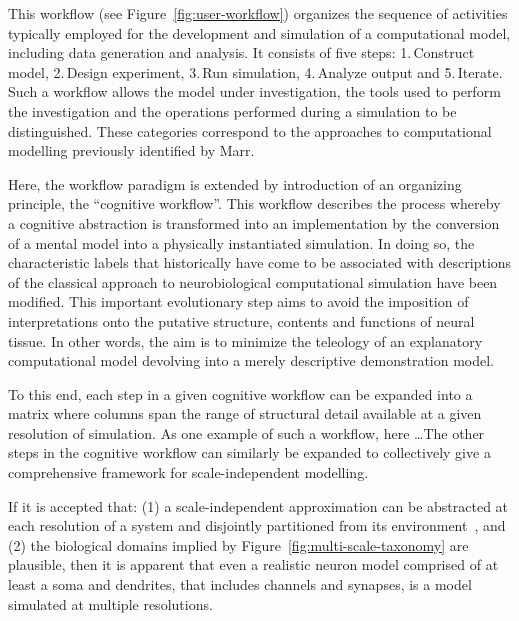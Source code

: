\documentclass[11pt,3p,twocolumn]{JMN}
\begin{document}
This workflow (see Figure~\ref{fig:user-workflow}) organizes the sequence of activities typically employed for the development and simulation of a computational model, including data generation and analysis.  It consists of five steps: 1.\,Construct model, 2.\,Design experiment, 3.\,Run simulation, 4.\,Analyze output and 5.\,Iterate.  Such a workflow allows the model under investigation, the tools used to perform the investigation and the operations performed during a simulation to be distinguished. These categories correspond to the approaches to computational modelling previously identified by Marr.  

Here, the workflow paradigm is extended by introduction of an organizing principle, the “cognitive workflow”. This workflow describes the process whereby a cognitive abstraction is transformed into an implementation by the conversion of a mental model into a physically instantiated simulation. In doing so, the characteristic labels that historically have come to be associated with descriptions of the classical approach to neurobiological computational simulation have been modified. This important evolutionary step aims to avoid the imposition of interpretations onto the putative structure, contents and functions of neural tissue. In other words, the aim is to minimize the teleology of an explanatory computational model devolving into a merely descriptive demonstration model.

To this end, each step in a given cognitive workflow can be expanded into a matrix where columns span the range of structural detail available at a given resolution of simulation.  As one example of such a workflow, here \ldots  The other steps in the cognitive workflow can similarly be expanded to collectively give a comprehensive framework for scale-independent modelling.

If it is accepted that: (1) a scale-independent approximation can be abstracted at each resolution of a system and disjointly partitioned from its environment~\citep{Bertalanffy:1973zr, Heylighen:2006vn}, and (2) the biological domains implied by Figure~\ref{fig:multi-scale-taxonomy} are plausible, then it is apparent that even a realistic neuron model comprised of at least a soma and dendrites, that includes channels and synapses, is a model simulated at multiple resolutions.
\end{document}
